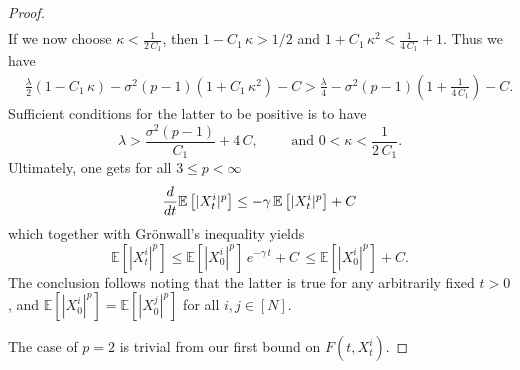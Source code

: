 \documentclass[10pt,a4paper]{amsart}
\newcommand{\rd}{{\rm d} }
\begin{document}
\begin{proof}
\begin{align*}
\end{align*}
If we now choose $\kappa<\frac{1}{2\,C_{1}}$, then $1-C_{1}\,\kappa>1/2$ and $1+C_{1}\,\kappa^{2}< \frac{1}{4\,C_{1}}+ 1$. Thus we have
\begin{align*}
    & \frac{\lambda}{2}\left(1 -C_{1}\,\kappa\right) - \sigma^{2}(p-1)\left(1+C_{1}\,\kappa^{2}\right) - C  > \frac{\lambda}{4} - \sigma^{2}(p-1)\left(1+\frac{1}{4\,C_{1}}\right) - C.
\end{align*}
Sufficient conditions for the latter to be positive is to have
\begin{equation}
\label{configuration}
    \lambda > \frac{\sigma^{2}(p-1)}{C_{1}} + 4 \,C,\quad \quad \text{ and } 0<\kappa < \frac{1}{2\,C_{1}}.
\end{equation}
Ultimately, one gets for all $3\leq p<\infty$
\begin{equation*}
    \frac{\rd}{\rd t}\mathbb{E}\left[|X^{i}_{t}|^{p}\right] \leq -\gamma\,\mathbb{E}\left[|X_{t}^{i}|^{p}\right] + C
\end{equation*}
which together with Gr\"{o}nwall's inequality yields
\begin{equation*}
    \mathbb{E}\left[ |X^{i}_{t}|^{p} \right] \leq \mathbb{E}\left[ |X^{i}_{0}|^{p} \right]\, e^{-\gamma\,t } + C \, \leq \mathbb{E}\left[ |X^{i}_{0}|^{p} \right] + C.
\end{equation*}
The conclusion follows noting that the latter is true for any arbitrarily fixed $t>0$, and $\mathbb{E}\left[ |X^{i}_{0}|^{p} \right] = \mathbb{E}\left[ |X^{j}_{0}|^{p} \right]$ for all $i,j \in [N]$. 


The case of $p=2$ is trivial from our first bound on $F(t,X^{i}_{t})$. 
\end{proof}
\end{document}
